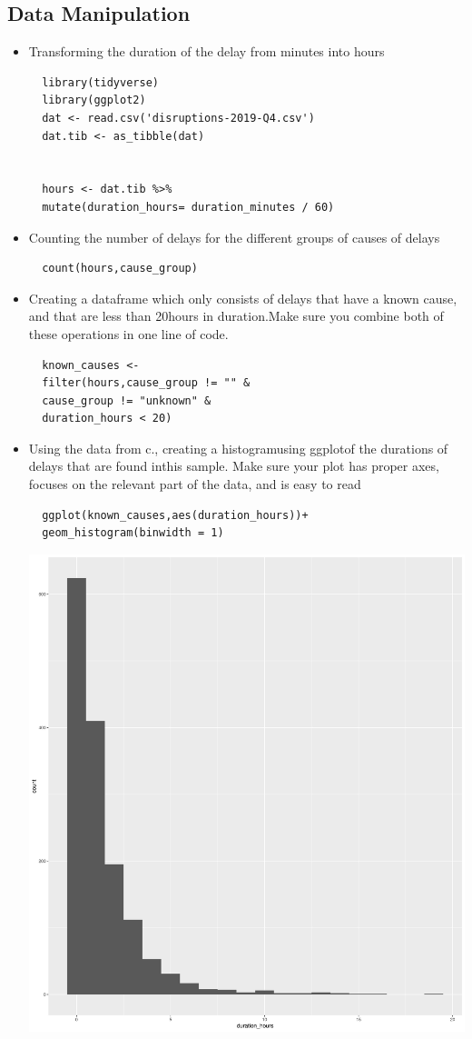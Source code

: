 \documentclass[11pt]{article}
\begin{document}
\subsection{Data Manipulation}
\label{sec:org90a1a8c}
\begin{itemize}
\item Transforming the duration of the delay from minutes into hours
\begin{verbatim}
  library(tidyverse)
  library(ggplot2)
  dat <- read.csv('disruptions-2019-Q4.csv')
  dat.tib <- as_tibble(dat)


  hours <- dat.tib %>%
  mutate(duration_hours= duration_minutes / 60)
\end{verbatim}
\item Counting the number of delays for the different groups of causes of delays
\begin{verbatim}
  count(hours,cause_group)
\end{verbatim}
\item Creating a dataframe which only consists of delays that have a known cause, and that are less than 20hours in duration.Make sure you combine both of these operations in one line of code.

\begin{verbatim}
  known_causes <-
  filter(hours,cause_group != "" &
  cause_group != "unknown" &
  duration_hours < 20)
\end{verbatim}
\item Using the data from c., creating a histogramusing ggplotof the durations of delays that are found inthis sample. Make sure your plot has proper axes, focuses on the relevant part of the data, and is easy to read
\begin{verbatim}
  ggplot(known_causes,aes(duration_hours))+
  geom_histogram(binwidth = 1)
\end{verbatim}
\begin{center}
  \includegraphics[width=.9\linewidth]{known_causes.jpg}
\end{center}
\end{itemize}
\end{document}
